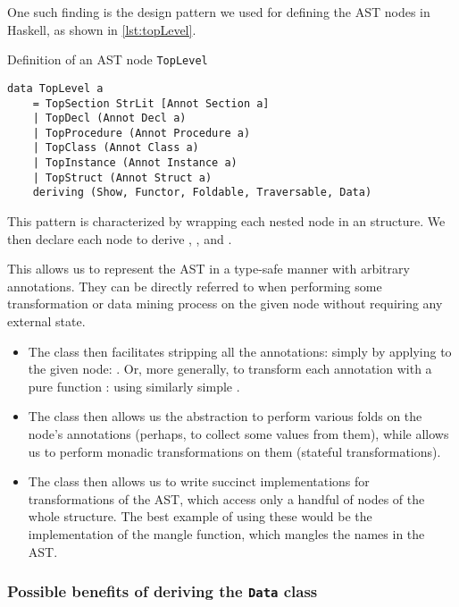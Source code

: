 One such finding is the design pattern we used for defining the AST nodes in Haskell, as shown in \cref{lst:topLevel}.

\begin{listing}
    \caption{Definition of an AST node \texttt{TopLevel}}
    \label{lst:topLevel}
    \begin{lstlisting}[style=haskellStyle]
data TopLevel a
    = TopSection StrLit [Annot Section a]
    | TopDecl (Annot Decl a)
    | TopProcedure (Annot Procedure a)
    | TopClass (Annot Class a)
    | TopInstance (Annot Instance a)
    | TopStruct (Annot Struct a)
    deriving (Show, Functor, Foldable, Traversable, Data)
    \end{lstlisting}
\end{listing}

This pattern is characterized by wrapping each nested node  in an  structure. We then declare each node to derive , ,  and .

This allows us to represent the AST in a type-safe manner with arbitrary annotations. They can be directly referred to when performing some transformation or data mining process on the given node without requiring any external state.

\begin{itemize}
    \item The  class then facilitates stripping all the annotations: simply by applying  to the given node: . Or, more generally, to transform each annotation with a pure function : using similarly simple .

    \item The  class then allows us the abstraction to perform various folds on the node's annotations (perhaps, to collect some values from them), while  allows us to perform monadic transformations on them (stateful transformations).

    \item The  class then allows us to write succinct implementations for transformations of the AST, which access only a handful of nodes of the whole structure. The best example of using these would be the implementation of the mangle function, which mangles the names in the AST.
\end{itemize}

\subsubsection{Possible benefits of deriving the \texttt{Data} class}

